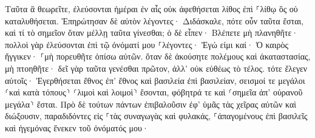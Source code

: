 \documentclass{openreader}
\begin{document}
Ταῦτα ἃ θεωρεῖτε, ἐλεύσονται ἡμέραι ἐν αἷς οὐκ ἀφεθήσεται λίθος ἐπὶ ⸀λίθῳ ὃς οὐ καταλυθήσεται. 
Ἐπηρώτησαν δὲ αὐτὸν λέγοντες· Διδάσκαλε, πότε οὖν ταῦτα ἔσται, καὶ τί τὸ σημεῖον ὅταν μέλλῃ ταῦτα γίνεσθαι; 
ὁ δὲ εἶπεν· Βλέπετε μὴ πλανηθῆτε· πολλοὶ γὰρ ἐλεύσονται ἐπὶ τῷ ὀνόματί μου ⸀λέγοντες· Ἐγώ εἰμι καί· Ὁ καιρὸς ἤγγικεν· ⸀μὴ πορευθῆτε ὀπίσω αὐτῶν. 
ὅταν δὲ ἀκούσητε πολέμους καὶ ἀκαταστασίας, μὴ πτοηθῆτε· δεῖ γὰρ ταῦτα γενέσθαι πρῶτον, ἀλλ’ οὐκ εὐθέως τὸ τέλος. 
τότε ἔλεγεν αὐτοῖς· Ἐγερθήσεται ἔθνος ἐπ’ ἔθνος καὶ βασιλεία ἐπὶ βασιλείαν, 
σεισμοί τε μεγάλοι ⸂καὶ κατὰ τόπους⸃ ⸂λιμοὶ καὶ λοιμοὶ⸃ ἔσονται, φόβητρά τε καὶ ⸂σημεῖα ἀπ’ οὐρανοῦ μεγάλα⸃ ἔσται. 
Πρὸ δὲ τούτων πάντων ἐπιβαλοῦσιν ἐφ’ ὑμᾶς τὰς χεῖρας αὐτῶν καὶ διώξουσιν, παραδιδόντες εἰς ⸀τὰς συναγωγὰς καὶ φυλακάς, ⸀ἀπαγομένους ἐπὶ βασιλεῖς καὶ ἡγεμόνας ἕνεκεν τοῦ ὀνόματός μου· 
\end{document}
